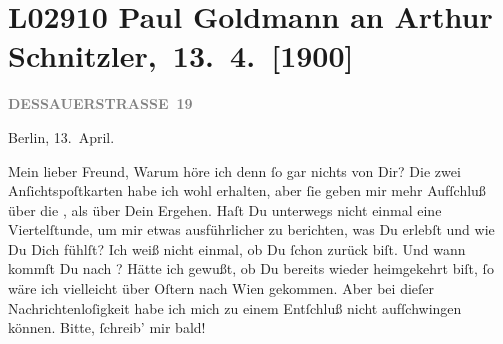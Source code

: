 

\section[ Paul Goldmann an Arthur Schnitzler, 13. 4. {[}1900{]}]{L02910 Paul Goldmann an Arthur Schnitzler, 13. 4. {[}1900{]}}
\nopagebreak{}
\rehead{ }\normalsize\beginnumbering{}
\toendnotes[C]{\smallbreak\pagebreak[2]}
\toendnotes[C]{\smallbreak}
\pstart
           {\pb}\textcolor{gray}{\textbf{DESSAUERSTRASSE 19}}\pend
           
\pstart
           \raggedleft{}Berlin, 13. April.\pend
           
\pstart{}Mein lieber Freund,\pend\vspace{0.5em}
\pstart
           Warum höre ich denn ſo gar nichts von Dir? Die zwei Anſichtspoſtkarten habe ich wohl
               erhalten, aber ſie geben mir mehr Aufſchluß über die \label{K_L02910-1v}\label{K_L02910-1}, als über Dein Ergehen. Haſt Du unterwegs nicht einmal eine Viertelſtunde, um
               mir etwas ausführlicher zu berichten, was Du erlebſt und wie Du Dich fühlſt? Ich weiß
               nicht einmal, ob Du ſchon zurück biſt. Und wann kommſt Du nach \label{K_L02910-2v}\label{K_L02910-2}?
               Hätte ich gewußt, ob Du bereits wieder {\pb}heimgekehrt
               biſt, ſo  wäre ich vielleicht über Oſtern nach
                  Wien gekommen. Aber bei dieſer
               Nachrichtenloſigkeit habe ich mich zu einem Entſchluß nicht aufſchwingen können.
               Bitte, ſchreib’ mir bald!\pend
           
